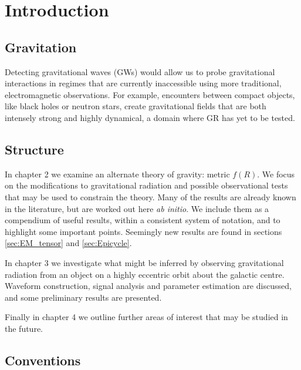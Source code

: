 \chapter{Introduction}\setcounter{page}{1}

\section{Gravitation}

Detecting gravitational waves (GWs) would allow us to probe gravitational interactions in regimes that are currently inaccessible using more traditional, electromagnetic observations. For example, encounters between compact objects, like black holes or neutron stars, create gravitational fields that are both intensely strong and highly dynamical, a domain where GR has yet to be tested.

\section{Structure}

In chapter 2 we examine an alternate theory of gravity: metric $f(R)$. We focus on the modifications to gravitational radiation and possible observational tests that may be used to constrain the theory. Many of the results are already known in the literature, but are worked out here {\it ab initio}. We include them as a compendium of useful results, within a consistent system of notation, and to highlight some important points. Seemingly new results are found in sections \ref{sec:EM_tensor} and \ref{sec:Epicycle}.

In chapter 3 we investigate what might be inferred by observing gravitational radiation from an object on a highly eccentric orbit about the galactic centre. Waveform construction, signal analysis and parameter estimation are discussed, and some preliminary results are presented.

Finally in chapter 4 we outline further areas of interest that may be studied in the future.

\section{Conventions}

